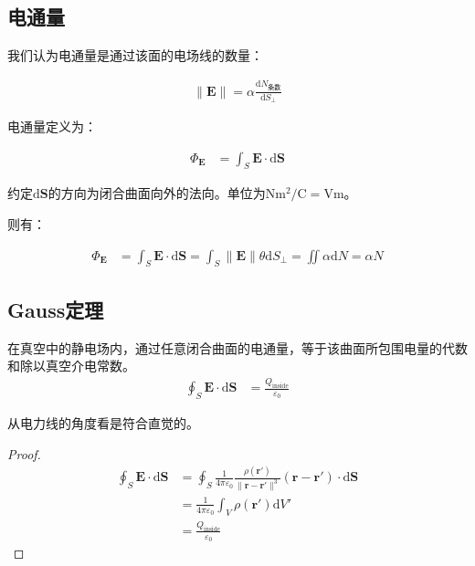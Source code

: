 \documentclass[12pt,onecolumn,a4paper]{book}
\numberwithin{table}{subsection}
\numberwithin{equation}{subsection}
\begin{document}
\subsection{电通量}

我们认为电通量是通过该面的电场线的数量：

\begin{align}
    \|\mathbf{E}\| = \alpha \frac{\mathrm{d}N_\text{条数}}{\mathrm{d}S_{\bot}}
\end{align}

电通量定义为：

\begin{align}
    \Phi_{\mathbf{E}} & = \int_{S} \mathbf{E} \cdot \mathrm{d} \mathbf{S}
\end{align}

约定$\mathrm{d} \mathbf{S}$的方向为闭合曲面向外的法向。单位为$\si{\newton\meter\squared\per\coulomb}=\si{\volt\meter}$。

则有：

\begin{align}
    \Phi_{\mathbf{E}} & = \int_{S} \mathbf{E} \cdot \mathrm{d} \mathbf{S} = \int_{S} \|\mathbf{E}\| \theta \mathrm{d} S_{\bot} = \iint \alpha \mathrm{d} N = \alpha N
\end{align}

\subsection{Gauss定理}

在真空中的静电场内，通过任意闭合曲面的电通量，等于该曲面所包围电量的代数和除以真空介电常数。
\begin{align}
    \oint_{S} \mathbf{E} \cdot \mathrm{d} \mathbf{S} & = \frac{Q_{\text{inside}}}{\varepsilon_0}
\end{align}

从电力线的角度看是符合直觉的。

\begin{proof}
    \begin{align}
        \oint_{S} \mathbf{E} \cdot \mathrm{d} \mathbf{S} & = \oint_{S} \frac{1}{4 \pi \varepsilon_0} \frac{\rho(\mathbf{r'})}{\|\mathbf{r}-\mathbf{r'}\|^3} (\mathbf{r}-\mathbf{r'}) \cdot \mathrm{d} \mathbf{S} \\
                                                         & = \frac{1}{4 \pi \varepsilon_0} \int_{V} \rho(\mathbf{r'}) \mathrm{d} V'                                                                              \\
                                                         & = \frac{Q_{\text{inside}}}{\varepsilon_0}
    \end{align}
\end{proof}
\end{document}
